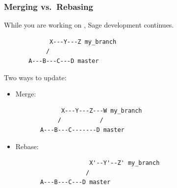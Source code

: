 {
  \begin{frame}[plain]
  \end{frame}
}




\begin{frame}[fragile]
  \frametitle{Merging vs.\ Rebasing}

  While you are working on , Sage development
  continues.
\begin{verbatim}
             X---Y---Z my_branch
            /
       A---B---C---D master
\end{verbatim}
  Two ways to update:
  \begin{itemize}
  \item Merge: 
\begin{verbatim}
             X---Y---Z---W my_branch
            /           /
       A---B---C-------D master
\end{verbatim}
  \item Rebase: 
\begin{verbatim}
                     X'--Y'--Z' my_branch
                    /
       A---B---C---D master
\end{verbatim}
  \end{itemize}
  
\end{frame}





